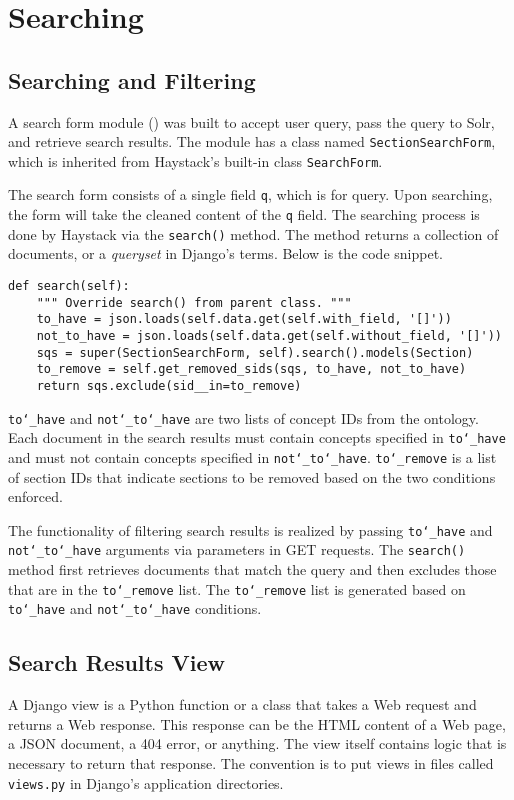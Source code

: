 \section{Searching}
\subsection{Searching and Filtering}
A search form module () was built to accept user query, pass the query to Solr, and retrieve search results. The module has a class named \texttt{SectionSearchForm}, which is inherited from Haystack's built-in class \texttt{SearchForm}.

The search form consists of a single field \texttt{q}, which is for query. Upon searching, the form will take the cleaned content of the \texttt{q} field. The searching process is done by Haystack via the \texttt{search()} method. The method returns a collection of documents, or a \textit{queryset} in Django's terms. Below is the code snippet. 

\begin{verbatim}
def search(self):
    """ Override search() from parent class. """
    to_have = json.loads(self.data.get(self.with_field, '[]'))
    not_to_have = json.loads(self.data.get(self.without_field, '[]'))
    sqs = super(SectionSearchForm, self).search().models(Section)
    to_remove = self.get_removed_sids(sqs, to_have, not_to_have)
    return sqs.exclude(sid__in=to_remove)
\end{verbatim}

\texttt{to\char`_have} and \texttt{not\char`_to\char`_have} are two lists of concept IDs from the ontology. Each document in the search results must contain concepts specified in \texttt{to\char`_have} and must not contain concepts specified in \texttt{not\char`_to\char`_have}. \texttt{to\char`_remove} is a list of section IDs that indicate sections to be removed based on the two conditions enforced. 

The functionality of filtering search results is realized by passing \texttt{to\char`_have} and  \texttt{not\char`_to\char`_have} arguments via parameters in GET requests. The \texttt{search()} method first retrieves documents that match the query and then excludes those that are in the \texttt{to\char`_remove} list. The \texttt{to\char`_remove} list is generated based on \texttt{to\char`_have} and  \texttt{not\char`_to\char`_have} conditions.

\subsection{Search Results View}
A Django view is a Python function or a class that takes a Web request and returns a Web response. This response can be the HTML content of a Web page, a JSON document, a 404 error, or anything. The view itself contains logic that is necessary to return that response. The convention is to put views in files called \texttt{views.py} in Django's application directories.

